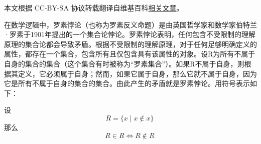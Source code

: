 
本文根据 CC-BY-SA 协议转载翻译自维基百科\href{https://en.wikipedia.org/wiki/Russell\%27s_paradox}{相关文章}。

在数学逻辑中，罗素悖论（也称为罗素反义命题）是由英国哲学家和数学家伯特兰·罗素于1901年提出的一个集合论悖论。罗素悖论表明，任何包含不受限制的理解原理的集合论都会导致矛盾。根据不受限制的理解原理，对于任何足够明确定义的属性，都存在一个集合，包含所有且仅包含具有该属性的对象。设R为所有不属于自身的集合的集合（这个集合有时被称为“罗素集合”）。如果R不属于自身，则根据其定义，它必须属于自身；然而，如果它属于自身，那么它就不属于自身，因为它是所有不属于自身的集合的集合。由此产生的矛盾就是罗素悖论。用符号表示如下：

设 
\[
R = \{ x \mid x \notin x \}~
\]
那么
\[
R \in R \iff R \notin R~
\]